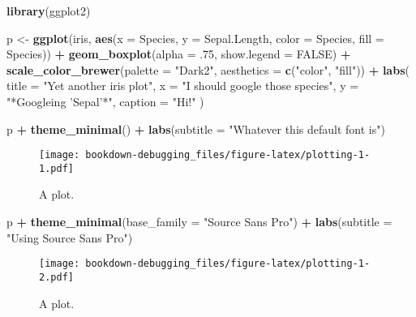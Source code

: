 \documentclass[ngerman,a4paper,]{scrartcl}
\newenvironment{Shaded}{\begin{snugshade}}{\end{snugshade}}
\newcommand{\DataTypeTok}[1]{\textcolor[rgb]{0.13,0.29,0.53}{#1}}
\newcommand{\FloatTok}[1]{\textcolor[rgb]{0.00,0.00,0.81}{#1}}
\newcommand{\KeywordTok}[1]{\textcolor[rgb]{0.13,0.29,0.53}{\textbf{#1}}}
\newcommand{\NormalTok}[1]{#1}
\newcommand{\OperatorTok}[1]{\textcolor[rgb]{0.81,0.36,0.00}{\textbf{#1}}}
\newcommand{\OtherTok}[1]{\textcolor[rgb]{0.56,0.35,0.01}{#1}}
\newcommand{\StringTok}[1]{\textcolor[rgb]{0.31,0.60,0.02}{#1}}
\begin{document}
\begin{Shaded}
\begin{Highlighting}[]
\KeywordTok{library}\NormalTok{(ggplot2)}

\NormalTok{p <-}\StringTok{ }\KeywordTok{ggplot}\NormalTok{(iris, }\KeywordTok{aes}\NormalTok{(}\DataTypeTok{x =}\NormalTok{ Species, }\DataTypeTok{y =}\NormalTok{ Sepal.Length, }\DataTypeTok{color =}\NormalTok{ Species, }\DataTypeTok{fill =}\NormalTok{ Species)) }\OperatorTok{+}
\StringTok{   }\KeywordTok{geom_boxplot}\NormalTok{(}\DataTypeTok{alpha =} \FloatTok{.75}\NormalTok{, }\DataTypeTok{show.legend =} \OtherTok{FALSE}\NormalTok{) }\OperatorTok{+}
\StringTok{   }\KeywordTok{scale_color_brewer}\NormalTok{(}\DataTypeTok{palette =} \StringTok{"Dark2"}\NormalTok{, }\DataTypeTok{aesthetics =} \KeywordTok{c}\NormalTok{(}\StringTok{"color"}\NormalTok{, }\StringTok{"fill"}\NormalTok{)) }\OperatorTok{+}
\StringTok{   }\KeywordTok{labs}\NormalTok{(}
      \DataTypeTok{title =} \StringTok{"Yet another iris plot"}\NormalTok{,}
      \DataTypeTok{x =} \StringTok{"I should google those species"}\NormalTok{,}
      \DataTypeTok{y =} \StringTok{"*Googleing 'Sepal'*"}\NormalTok{,}
      \DataTypeTok{caption =} \StringTok{"Hi!"}
\NormalTok{   )}

\NormalTok{p }\OperatorTok{+}\StringTok{ }\KeywordTok{theme_minimal}\NormalTok{() }\OperatorTok{+}
\StringTok{   }\KeywordTok{labs}\NormalTok{(}\DataTypeTok{subtitle =} \StringTok{"Whatever this default font is"}\NormalTok{)}
\end{Highlighting}
\end{Shaded}

\begin{figure}
\centering
\texttt{[image: bookdown-debugging\_files/figure-latex/plotting-1-1.pdf]}
\caption{\label{fig:plotting-1-1}A plot.}
\end{figure}

\begin{Shaded}
\begin{Highlighting}[]
\NormalTok{p }\OperatorTok{+}\StringTok{ }\KeywordTok{theme_minimal}\NormalTok{(}\DataTypeTok{base_family =} \StringTok{"Source Sans Pro"}\NormalTok{) }\OperatorTok{+}
\StringTok{   }\KeywordTok{labs}\NormalTok{(}\DataTypeTok{subtitle =} \StringTok{"Using Source Sans Pro"}\NormalTok{)}
\end{Highlighting}
\end{Shaded}

\begin{figure}
\centering
\texttt{[image: bookdown-debugging\_files/figure-latex/plotting-1-2.pdf]}
\caption{\label{fig:plotting-1-2}A plot.}
\end{figure}
\end{document}

